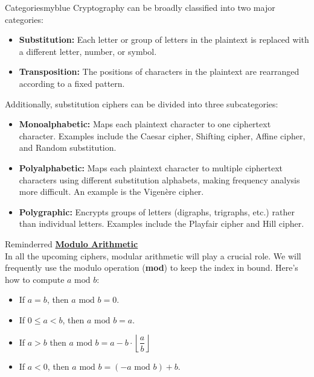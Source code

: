 \begin{prettyBox}{Categories}{myblue}
Cryptography can be broadly classified into two major categories:

\begin{itemize}
    \item \textbf{Substitution:} Each letter or group of letters in the
plaintext is replaced with a different letter, number, or symbol.
    \item \textbf{Transposition:} The positions of characters in the plaintext
are rearranged according to a fixed pattern.
\end{itemize}

Additionally, substitution ciphers can be divided into three subcategories:

\begin{itemize}
    \item \textbf{Monoalphabetic:} Maps each plaintext character to one 
ciphertext character. Examples include the Caesar cipher, Shifting cipher,
Affine cipher, and Random substitution.
    \item \textbf{Polyalphabetic:} Maps each plaintext character to multiple
ciphertext characters using different substitution alphabets, making frequency
analysis more difficult. An example is the Vigenère cipher.
    \item \textbf{Polygraphic:} Encrypts groups of letters 
(digraphs, trigraphs, etc.) rather than individual letters. Examples include
the Playfair cipher and Hill cipher.
\end{itemize}
\end{prettyBox}

\vspace{1cm}


\begin{prettyBox}{Reminder}{red}
\textbf{\underline{Modulo Arithmetic}} \\[0.15cm]
In all the upcoming ciphers, modular arithmetic will play a crucial role. We will
frequently use the modulo operation (\textbf{mod}) to keep the index in bound. Here’s how to 
compute \( a \text{ mod } b \):
\begin{itemize}
    \item If \( a = b \), then \( a \text{ mod } b = 0 \).
    \item If \( 0 \leq a < b \), then \( a \text{ mod } b = a \).
    \item If \(a > b\) then \(a \text{ mod } b = a - b\cdot \left\lfloor \dfrac{a}{b} \right\rfloor \)
    \item If \( a < 0 \), then \( a \text{ mod } b = ( -a \text{ mod } b ) + b \).
\end{itemize}
\end{prettyBox}

